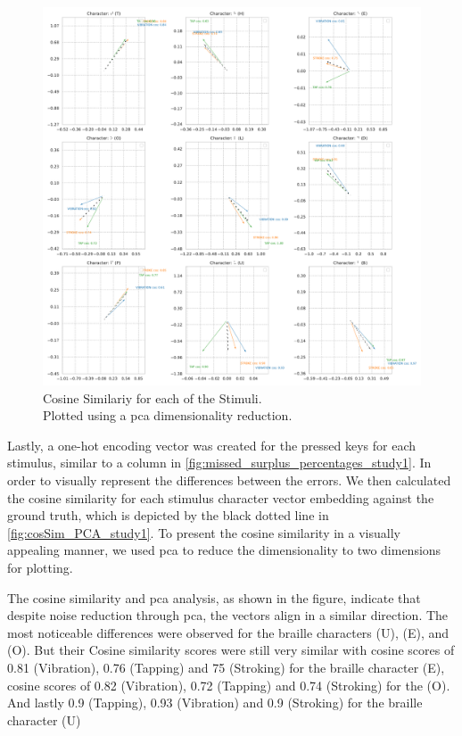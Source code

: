 \begin{figure}
    \centering
    \includegraphics[width=\linewidth]{src/pictures/Study1Data_Experiment/Vectors_study1.pdf}
    \caption{Cosine Similariy for each of the Stimuli.\\Plotted using a \gls{pca} dimensionality reduction.}
    \label{fig:cosSim_PCA_study1}
\end{figure}

Lastly, a one-hot encoding vector was created for the pressed keys for each stimulus, similar to a column in \autoref{fig:missed_surplus_percentages_study1}. 
In order to visually represent the differences between the errors.
We then calculated the cosine similarity for each stimulus character vector embedding against the ground truth, which is depicted by the black dotted line in \autoref{fig:cosSim_PCA_study1}.
To present the cosine similarity in a visually appealing manner, we used \gls{pca} to reduce the dimensionality to two dimensions for plotting.

The cosine similarity and \gls{pca} analysis, as shown in the figure, indicate that despite noise reduction through \gls{pca}, the vectors align in a similar direction. The most noticeable differences were observed for the braille characters (U), (E), and (O).
But their Cosine similarity scores were still very similar with cosine scores of 0.81 (Vibration), 0.76 (Tapping) and 75 (Stroking) for the braille character (E), cosine scores of 0.82 (Vibration), 0.72 (Tapping) and 0.74 (Stroking) for the (O).
And lastly 0.9 (Tapping), 0.93 (Vibration) and 0.9 (Stroking) for the braille character (U)



